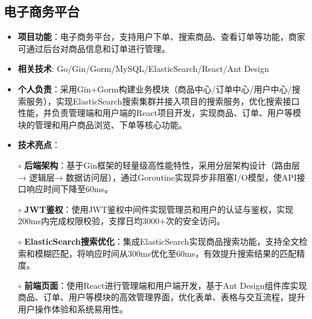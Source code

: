 \subsection{\textbf{电子商务平台} \hspace{2cm}{2024.10 -- 2024.12}}
  \begin{normalsize}
    \begin{itemize}
    \item \textbf{项目功能}：电子商务平台，支持用户下单、搜索商品、查看订单等功能，商家可通过后台对商品信息和订单进行管理。
    \item \textbf{相关技术}: Go/Gin/Gorm/MySQL/ElasticSearch/React/Ant Design
    \item \textbf{个人负责}：采用Gin+Gorm构建业务模块（商品中心/订单中心/用户中心/搜索服务），实现ElasticSearch搜索集群并接入项目的搜索服务，优化搜索接口性能，并负责管理端和用户端的React项目开发，实现商品、订单、用户等模块的管理和用户商品浏览、下单等核心功能。
    \item \textbf{技术亮点}：
    \setlength{\itemindent}{1em} %
      \item[$\circ$] \textbf{后端架构}：基于Gin框架的轻量级高性能特性，采用分层架构设计（路由层→ 逻辑层→ 数据访问层），通过Goroutine实现异步非阻塞I/O模型，使API接口响应时间下降至60ms。
        \item[$\circ$] \textbf{JWT鉴权}：使用JWT鉴权中间件实现管理员和用户的认证与鉴权，实现200ms内完成权限校验，支撑日均3000+次的安全访问。
        \item[$\circ$] \textbf{ElasticSearch搜索优化}：集成ElasticSearch实现商品搜索功能，支持全文检索和模糊匹配，将响应时间从300ms优化至60ms，有效提升搜索结果的匹配精度。
        \item[$\circ$] \textbf{前端页面}：使用React进行管理端和用户端开发，基于Ant Design组件库实现商品、订单、用户等模块的高效管理界面，优化表单、表格与交互流程，提升用户操作体验和系统易用性。
    \end{itemize}
  \end{normalsize}